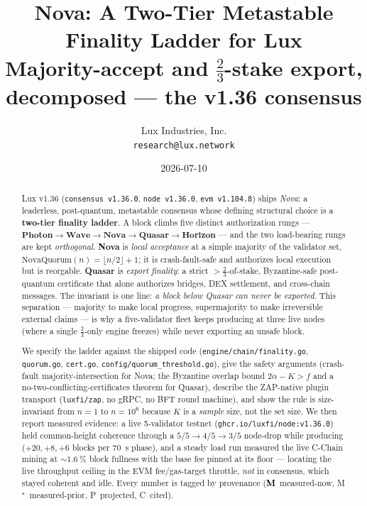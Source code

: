 \documentclass[11pt,a4paper]{article}
\title{Nova: A Two-Tier Metastable Finality Ladder for Lux\\[4pt]
       \large Majority-accept and \(\tfrac{2}{3}\)-stake export, decomposed --- the v1.36 consensus}
\author{Lux Industries, Inc. \\
        \texttt{research@lux.network}}
\date{2026-07-10}
\newcommand{\Mnow}{\textbf{\textcolor{black}{M}}}   %
\newcommand{\Mprior}{M$^\star$}                      %
\newcommand{\Proj}{P}                                %
\newcommand{\Claim}{C}                               %
\begin{document}
\luxcoverpage

\begin{abstract}
Lux v1.36 (\texttt{consensus v1.36.0}, \texttt{node v1.36.0}, \texttt{evm v1.104.8})
ships \emph{Nova}: a leaderless, post-quantum, metastable consensus whose defining
structural choice is a \textbf{two-tier finality ladder}. A block climbs five distinct
authorization rungs --- \(\textbf{Photon} \to \textbf{Wave} \to \textbf{Nova} \to
\textbf{Quasar} \to \textbf{Horizon}\) --- and the two load-bearing rungs are kept
\emph{orthogonal}. \textbf{Nova} is \emph{local acceptance} at a simple majority of the
validator set, \(\mathrm{NovaQuorum}(n)=\lfloor n/2\rfloor + 1\); it is crash-fault-safe
and authorizes local execution but is reorgable. \textbf{Quasar} is \emph{export
finality}: a strict \(>\tfrac{2}{3}\)-of-stake, Byzantine-safe post-quantum certificate
that alone authorizes bridges, DEX settlement, and cross-chain messages. The invariant is
one line: \emph{a block below Quasar can never be exported}. This separation --- majority
to make local progress, supermajority to make irreversible external claims --- is why a
five-validator fleet keeps producing at three live nodes (where a single
\(\tfrac{2}{3}\)-only engine freezes) while never exporting an unsafe block.

We specify the ladder against the shipped code (\texttt{engine/chain/finality.go},
\texttt{quorum.go}, \texttt{cert.go}, \texttt{config/quorum\_threshold.go}), give the
safety arguments (crash-fault majority-intersection for Nova; the Byzantine overlap bound
\(2\alpha - K > f\) and a no-two-conflicting-certificates theorem for Quasar), describe the
ZAP-native plugin transport (\texttt{luxfi/zap}, no gRPC, no BFT round machine), and show
the rule is size-invariant from \(n=1\) to \(n=10^{6}\) because \(K\) is a \emph{sample}
size, not the set size. We then report measured evidence: a live \num{5}-validator testnet
(\texttt{ghcr.io/luxfi/node:v1.36.0}) held common-height coherence through a
\(5/5 \to 4/5 \to 3/5\) node-drop while producing (\(+20,+8,+6\) blocks per \SI{70}{s}
phase), and a steady load run measured the live C-Chain mining at
\(\sim\!\SI{1.6}{\percent}\) block fullness with the base fee pinned at its floor ---
locating the live throughput ceiling in the EVM fee/gas-target throttle, \emph{not} in
consensus, which stayed coherent and idle. Every number is tagged by provenance
(\Mnow\ measured-now, \Mprior\ measured-prior, \Proj\ projected, \Claim\ cited).
\end{abstract}
\end{document}
